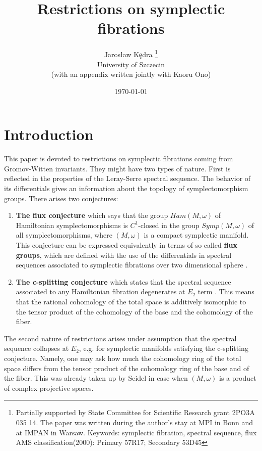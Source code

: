 \documentclass[a4paper,14pt]{article}
\title{Restrictions on symplectic fibrations}
\author{Jaros{\l}aw K\c edra
               \thanks{Partially supported by 
State Committee for Scientific Research grant 2PO3A 035 14. The paper was
written during the author's stay at MPI in Bonn
and at IMPAN in Warsaw.
        \newline
        Keywords: symplectic fibration, spectral sequence, flux 
        \newline
        AMS classification(2000): Primary 57R17;
        Secondary 53D45}\\
 University of Szczecin\\
(with an appendix written jointly with Kaoru Ono)}
\date{\today}
\newcommand{\Mo}{(M,\omega )}
\newcommand{\BS}{{\bigskip}}
\numberwithin{equation}{section}
\begin{document}



\maketitle


\BS

\section{Introduction}\label{S:intro}



This paper is devoted to restrictions on symplectic fibrations
coming from Gromov-Witten invariants. They might have two types
of nature. First is reflected in the properties of the Leray-Serre 
spectral sequence. The behavior of its differentials 
gives an information about the topology of symplectomorphism
groups. There arises two conjectures:

\begin{enumerate}
\item {\bf The flux conjecture} which says that the group
$Ham\Mo $ of Hamiltonian symplectomorphisms is $C^1$-closed
in the group $Symp\Mo $ of all symplectomorphisms, where
$\Mo $ is a compact symplectic manifold. This conjecture
can be expressed equivalently in terms of so called
{\bf flux groups}, which are defined with the use of
the differentials in spectral sequences associated to
symplectic fibrations over two dimensional sphere \cite{lmp1,ms1}. 

\item {\bf The c-splitting conjecture} which states that
the spectral sequence associated to any Hamiltonian fibration
degenerates at $E_2$ term \cite{lm}. This means that the
rational cohomology of the total space is additively isomorphic 
to the tensor product of the cohomology of the base and the
cohomology of the fiber.
\end{enumerate}


The second nature of restrictions arises under assumption
that the spectral sequence collapses at $E_2$, e.g. for
symplectic manifolds satisfying the c-splitting conjecture.
Namely, one may ask how much the cohomology ring of the total
space differs from the tensor product of the cohomology ring
of the base and of the fiber. This was already taken up by Seidel
\cite{se} in case when $\Mo $ is a product of complex
projective spaces.
\end{document}
